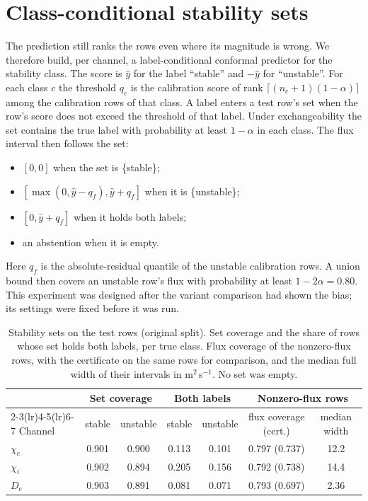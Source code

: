 \documentclass[11pt]{article}
\begin{document}
\section{Class-conditional stability sets}

The prediction still ranks the rows even where its magnitude is wrong.  We
therefore build, per channel, a label-conditional conformal predictor
\citep{Vovk2012} for the stability class.  The score is $\hat{y}$ for the label
``stable'' and $-\hat{y}$ for ``unstable''.  For each class $c$ the threshold
$q_c$ is the calibration score of rank $\lceil (n_c+1)(1-\alpha) \rceil$ among
the calibration rows of that class.  A label enters a test row's set when the
row's score does not exceed the threshold of that label.  Under exchangeability
the set contains the true label with probability at least $1-\alpha$ in each
class.  The flux interval then follows the set:
\begin{itemize}
\item $[0, 0]$ when the set is \{stable\};
\item $[\max(0, \hat{y} - q_f), \hat{y} + q_f]$ when it is \{unstable\};
\item $[0, \hat{y} + q_f]$ when it holds both labels;
\item an abstention when it is empty.
\end{itemize}
Here $q_f$ is the absolute-residual quantile of the unstable calibration rows.
A union bound then covers an unstable row's flux with probability at least
$1-2\alpha = 0.80$.  This experiment was designed after the variant comparison
had shown the bias; its settings were fixed before it was run.

\begin{table}[ht]
\centering
\caption{Stability sets on the test rows (original split).  Set coverage and
the share of rows whose set holds both labels, per true class.  Flux coverage
of the nonzero-flux rows, with the certificate on the same rows for
comparison, and the median full width of their intervals in
m$^2$\,s$^{-1}$.  No set was empty.}
\label{tab:sets}
\small
\begin{tabular}{lcccccc}
\toprule
 & \multicolumn{2}{c}{Set coverage} & \multicolumn{2}{c}{Both labels} & \multicolumn{2}{c}{Nonzero-flux rows} \\
\cmidrule(lr){2-3}\cmidrule(lr){4-5}\cmidrule(lr){6-7}
Channel & stable & unstable & stable & unstable & flux coverage (cert.) & median width \\
\midrule
$\chi_e$ & 0.901 & 0.900 & 0.113 & 0.101 & 0.797 (0.737) & 12.2 \\
$\chi_i$ & 0.902 & 0.894 & 0.205 & 0.156 & 0.792 (0.738) & 14.4 \\
$D_e$ & 0.903 & 0.891 & 0.081 & 0.071 & 0.793 (0.697) & 2.36 \\
\bottomrule
\end{tabular}
\end{table}
\end{document}
